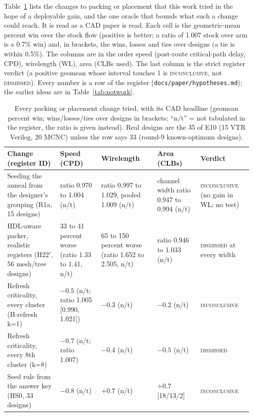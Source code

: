 Table~\ref{tab:tried} lists the changes to packing or placement that this work tried in the hope of a deployable gain, and the one oracle that bounds what such a change could reach. It is read as a CAD paper is read. Each cell is the geometric-mean percent win over the stock flow (positive is better; a ratio of 1.007 stock over arm is a 0.7\% win) and, in brackets, the wins, losses and ties over designs (a tie is within 0.5\%). The columns are in the order speed (post-route critical-path delay, CPD), wirelength (WL), area (CLBs used). The last column is the strict register verdict (a positive geomean whose interval touches 1 is \textsc{inconclusive}, not \textsc{dismissed}). Every number is a row of the register (\texttt{docs/paper/hypotheses.md}); the earlier ideas are in Table~\ref{tab:notwork}.

\begin{table}[t]
\centering
\caption{Every packing or placement change tried, with its CAD headline (geomean percent win; wins/losses/ties over designs in brackets; ``n/t'' = not tabulated in the register, the ratio is given instead). Real designs are the 35 of E10 (15 VTR Verilog, 20 MCNC) unless the row says 33 (round-9 known-optimum designs).}
\label{tab:tried}
\footnotesize
\setlength{\tabcolsep}{3pt}
\begin{tabular}{@{}p{3.9cm}p{2.9cm}p{2.9cm}p{2.9cm}p{3.6cm}@{}}
\toprule
Change (register ID) & Speed (CPD) & Wirelength & Area (CLBs) & Verdict \\
\midrule
Seeding the anneal from the designer's grouping (R1a, 15 designs) & ratio 0.970 to 1.004 (n/t) & ratio 0.997 to 1.029, pooled 1.009 (n/t) & channel width ratio 0.947 to 0.994 (n/t) & \textsc{inconclusive} (no gain in WL; no test) \\
HDL-aware packer, realistic registers (H22$'$, 56 mesh/tree designs) & 33 to 41 percent worse (ratio 1.33 to 1.41, n/t) & 65 to 150 percent worse (ratio 1.652 to 2.505, n/t) & ratio 0.946 to 1.033 (n/t) & \textsc{dismissed} at every width \\
Refresh criticality, every cluster (H-refresh k=1) & $-0.5$ (n/t; ratio 1.005 [0.990, 1.021]) & $-0.3$ (n/t) & $-0.2$ (n/t) & \textsc{inconclusive} \\
Refresh criticality, every 8th cluster (k=8) & $-0.7$ (n/t; ratio 1.007) & $-0.4$ (n/t) & $-0.5$ (n/t) & \textsc{dismissed} \\
Seed rule from the answer key (HS0, 33 designs) & $-0.8$ (n/t) & $+0.7$ (n/t) & $+0.7$ [18/13/2] & \textsc{inconclusive} \\

\end{tabular}
\end{table}
